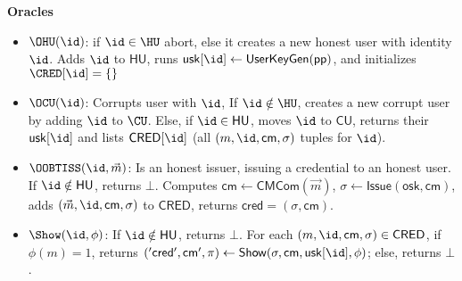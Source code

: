 \noindent\textbf{Oracles}
\begin{itemize}
    \item $\OHU(\id)$: if $\id \in \HU$ abort, else it creates a new honest user with identity $\id$. Adds $\id$ to $\mathsf{HU}$, runs $\mathsf{usk}[\id] \leftarrow \mathsf{UserKeyGen(pp)}$, and initializes $\CRED[\id] = \{\}$
    
    \item $\OCU(\id)$: Corrupts user with $\id$, If $\id \notin \HU$, creates a new corrupt user by adding $\id$ to $\CU$. Else, if $\id \in \mathsf{HU}$, moves $\id$ to $\mathsf{CU}$, returns their $\mathsf{usk}[\id]$ and lists $\mathsf{CRED}[\id]$ (all $(m, \id, \mathsf{cm}, \sigma)$ tuples for $\id$).
    
    \item $\OOBTISS(\id, \vec{m})$: Is an honest issuer, issuing a credential to an honest user. If $\id \notin \mathsf{HU}$, returns $\bot$. Computes $\mathsf{cm} \leftarrow \mathsf{CMCom}(\vec{m})$, $\sigma \leftarrow \mathsf{Issue}(\mathsf{osk}, \mathsf{cm})$, adds $(\vec{m}, \id, \mathsf{cm}, \sigma)$ to $\mathsf{CRED}$, returns $\mathsf{cred} = (\sigma, \mathsf{cm})$.
    
    \item $\Show(\id, \phi)$: If $\id \notin \mathsf{HU}$, returns $\bot$. For each $(m, \id, \mathsf{cm}, \sigma) \in \mathsf{CRED}$, if $\phi(m) = 1$, returns $(\mathsf{'cred'}, \mathsf{cm'}, \pi) \leftarrow \mathsf{Show}(\sigma, \mathsf{cm}, \mathsf{usk}[\id], \phi)$; else, returns $\bot$.
\end{itemize}
